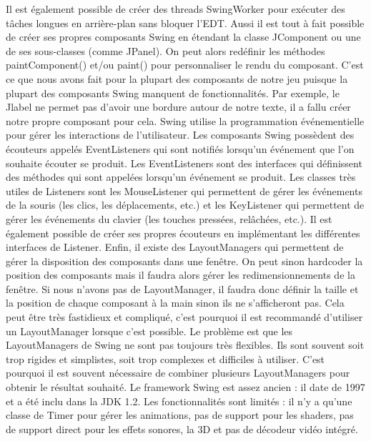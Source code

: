 \documentclass{article}
\begin{document}
    Il est également possible de créer des threads SwingWorker pour exécuter des tâches longues en arrière-plan sans bloquer l'EDT.
    Aussi il est tout à fait possible de créer ses propres composants Swing en étendant la classe JComponent ou une de ses sous-classes (comme JPanel).
    On peut alors redéfinir les méthodes paintComponent() et/ou paint() pour personnaliser le rendu du composant.
    C'est ce que nous avons fait pour la plupart des composants de notre jeu puisque la plupart des composants Swing manquent de fonctionnalités.
    Par exemple, le Jlabel ne permet pas d'avoir une bordure autour de notre texte, il a fallu créer notre propre composant pour cela.
    \newline
    Swing utilise la programmation événementielle pour gérer les interactions de l'utilisateur.
    Les composants Swing possèdent des écouteurs appelés EventListeners qui sont notifiés lorsqu'un événement que l'on souhaite écouter se produit.
    Les EventListeners sont des interfaces qui définissent des méthodes qui sont appelées lorsqu'un événement se produit.
    Les classes très utiles de Listeners sont les MouseListener qui permettent de gérer les événements de la souris (les clics, les déplacements, etc.) et les KeyListener qui permettent de gérer les événements du clavier (les touches pressées, relâchées, etc.).
    Il est également possible de créer ses propres écouteurs en implémentant les différentes interfaces de Listener.
    \newline
    Enfin, il existe des LayoutManagers qui permettent de gérer la disposition des composants dans une fenêtre.
    On peut sinon hardcoder la position des composants mais il faudra alors gérer les redimensionnements de la fenêtre.
    Si nous n'avons pas de LayoutManager, il faudra donc définir la taille et la position de chaque composant à la main sinon ils ne s'afficheront pas.
    Cela peut être très fastidieux et compliqué, c'est pourquoi il est recommandé d'utiliser un LayoutManager lorsque c'est possible.
    Le problème est que les LayoutManagers de Swing ne sont pas toujours très flexibles.
    Ils sont souvent soit trop rigides et simplistes, soit trop complexes et difficiles à utiliser.
    C'est pourquoi il est souvent nécessaire de combiner plusieurs LayoutManagers pour obtenir le résultat souhaité.
    \newline
    Le framework Swing est assez ancien : il date de 1997 et a été inclu dans la JDK 1.2.
    Les fonctionnalités sont limités : il n'y a qu'une classe de Timer pour gérer les animations, pas de support pour les shaders, pas de support direct pour les effets sonores, la 3D et pas de décodeur vidéo intégré.
\end{document}

